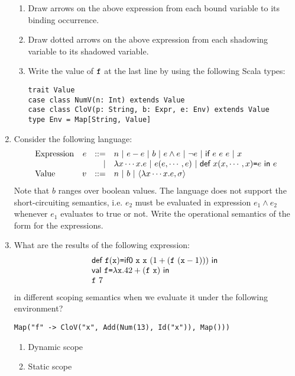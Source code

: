 \begin{enumerate}
\begin{enumerate}
\item Draw arrows on the above expression from each bound variable to its binding occurrence.
\item Draw dotted arrows on the above expression from each shadowing variable to its shadowed variable.
\item Write the value of $\texttt{f}$ at the last line by using the following Scala types:
\begin{verbatim}
trait Value
case class NumV(n: Int) extends Value
case class CloV(p: String, b: Expr, e: Env) extends Value
type Env = Map[String, Value]
\end{verbatim}
\end{enumerate}

\item Consider the following language:
\[
\begin{array}{lrrl}
  \text{Expression} & e & ::= & n\ |\ \esub{e}{e}\ |\ b\ |\ e\wedge e\ |\ \neg
  e\ |\ \textsf{if}\ e\ e\ e\ |\ x \\
  &&|& \efun{x\cdots x}{e}\ |\ \eappfo{e}{e,\cdots,e}\ |\
  \erec{x}{x,\cdots,x}{e}{e} \\
  \text{Value} & v & ::= & n\ |\ b\ |\ \clov{x\cdots x}{e}{\sigma} \\
\end{array}
\]
Note that $b$ ranges over boolean values. The language does not support the short-circuiting
semantics, i.e. $e_2$ must be evaluated in expression $e_1\wedge e_2$ whenever $e_1$
evaluates to true or not.
Write the operational semantics of the form  for the expressions.

\item What are the results of the following expression:
\[
  \begin{array}{l}
  \textsf{def}\ \texttt{f}(\texttt{x})\texttt{=}\textsf{if0}\ \texttt{x}\ \texttt{x}\ (1+(\texttt{f}\ (\texttt{x}-1)))\ \textsf{in}\ \\
  \textsf{val}\ \texttt{f}\texttt{=}\lambda\texttt{x}.42+(\texttt{f}\ \texttt{x})\ \textsf{in}\ \\
  \texttt{f}\ 7
 
 
  \end{array}
\]
in different scoping semantics when we evaluate it under the following environment?
\begin{verbatim}
Map("f" -> CloV("x", Add(Num(13), Id("x")), Map()))
\end{verbatim}

\begin{enumerate}
  \item Dynamic scope
  \item Static scope
\end{enumerate}


\end{enumerate}
